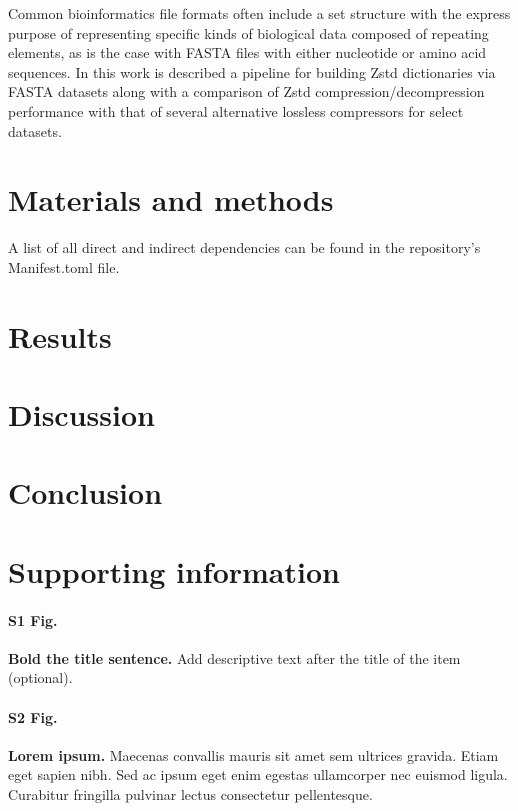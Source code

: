 \documentclass[
  10pt,
  letterpaper,
]{article}
\begin{document}
Common bioinformatics file formats often include a set structure with
the express purpose of representing specific kinds of biological data
composed of repeating elements, as is the case with FASTA files with
either nucleotide or amino acid sequences. In this work is described a
pipeline for building Zstd dictionaries via FASTA datasets along with a
comparison of Zstd compression/decompression performance with that of
several alternative lossless compressors for select datasets.

\hypertarget{materials-and-methods}{%
\section{Materials and methods}\label{materials-and-methods}}

A list of all direct and indirect dependencies can be found in the
repository's Manifest.toml file.

\hypertarget{results}{%
\section{Results}\label{results}}

\hypertarget{discussion}{%
\section{Discussion}\label{discussion}}

\hypertarget{conclusion}{%
\section{Conclusion}\label{conclusion}}

\hypertarget{supporting-information}{%
\section{Supporting information}\label{supporting-information}}

\paragraph*{S1 Fig.}
\label{s1-fig}
{\textbf{Bold the title sentence.}} Add descriptive text after the title
of the item (optional).

\paragraph*{S2 Fig.}
\label{s2-fig}
{\textbf{Lorem ipsum.}} Maecenas convallis mauris sit amet sem ultrices
gravida. Etiam eget sapien nibh. Sed ac ipsum eget enim egestas
ullamcorper nec euismod ligula. Curabitur fringilla pulvinar lectus
consectetur pellentesque.
\end{document}
